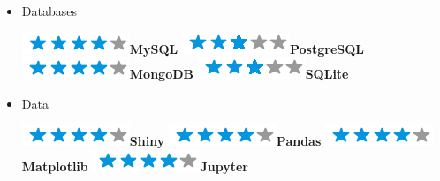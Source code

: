 \documentclass[]{friggeri-cv}
\begin{document}
\begin{flushleft}
\begin{multicols}{3}
\begin{itemize}
\columnbreak
\item \large Databases \
\normalsize
\begin{flushleft}

\includegraphics[scale=0.40]{res/img/4stars.png}\hspace{1.5mm}\textbf{MySQL}
\includegraphics[scale=0.40]{res/img/3stars.png}\hspace{1.5mm}\textbf{PostgreSQL}
\includegraphics[scale=0.40]{res/img/4stars.png}\hspace{1.5mm}\textbf{MongoDB}
\includegraphics[scale=0.40]{res/img/3stars.png}\hspace{1.5mm}\textbf{SQLite}
\end{flushleft}            

\item \large Data \
\normalsize
\begin{flushleft}

\includegraphics[scale=0.40]{res/img/4stars.png}\hspace{1.5mm}\textbf{Shiny}
\includegraphics[scale=0.40]{res/img/4stars.png}\hspace{1.5mm}\textbf{Pandas}
\includegraphics[scale=0.40]{res/img/4stars.png}\hspace{1.5mm}\textbf{Matplotlib}
\includegraphics[scale=0.40]{res/img/4stars.png}\hspace{1.5mm}\textbf{Jupyter}
\end{flushleft}            


\end{itemize}
\end{multicols}
\end{flushleft}
\end{document}
